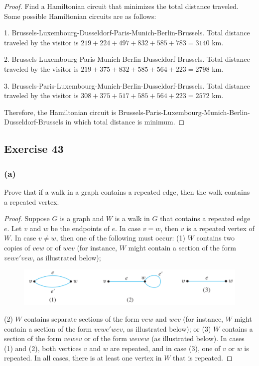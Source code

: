 \documentclass[14pt]{extarticle}
\begin{document}
\begin{proof}
    Find a Hamiltonian circuit that minimizes the total distance traveled. Some possible Hamiltonian circuits are as follows:

    1. Brussels-Luxembourg-Dusseldorf-Paris-Munich-Berlin-Brussels. Total distance traveled by the visitor is \(219 +
    224 + 497 + 832 + 585 + 783 = 3140\) km.

    2. Brussels-Luxembourg-Paris-Munich-Berlin-Dusseldorf-Brussels. Total distance traveled by the visitor is \(219 +
    375 + 832 + 585 + 564 + 223 = 2798\) km.

    3. Brussels-Paris-Luxembourg-Munich-Berlin-Dusseldorf-Brussels. Total distance traveled by the visitor is \(308 +
    375 + 517 + 585 + 564 + 223 = 2572\) km.

    Therefore, the Hamiltonian circuit is Brussels-Paris-Luxembourg-Munich-Berlin- \\ Dusseldorf-Brussels in which
    total distance is minimum.
\end{proof}

\subsection{Exercise 43}
\subsubsection{(a)}
Prove that if a walk in a graph contains a repeated edge, then the walk contains a repeated vertex.

\begin{proof}
    Suppose \(G\) is a graph and \(W\) is a walk in \(G\) that contains a repeated edge \(e\). Let \(v\) and \(w\) be the
    endpoints of \(e\). In case \(v = w\), then \(v\) is a repeated vertex of \(W\). In case \(v \neq w\), then one of
    the following must occur: (1) \(W\) contains two copies of \(vew\) or of \(wev\) (for instance, \(W\) might contain a
    section of the form \(vewe'vew\), as illustrated below);

    \begin{figure}[ht!]
        \centering
        \includegraphics[scale=0.35]{../images/10.1.43.a.png}
    \end{figure}

    (2) \(W\) contains separate sections of the form \(vew\) and
    \(wev\) (for instance, \(W\) might contain a section of the form \(vewe'wev\), as illustrated below); or (3) \(W\)
    contains a section of the form \(vewev\) or of the form \(wevew\) (as illustrated below). In cases (1) and (2), both
    vertices \(v\) and \(w\) are repeated, and in case (3), one of \(v\) or \(w\) is repeated. In all cases, there is at least
    one vertex in \(W\) that is repeated.
\end{proof}
\end{document}
